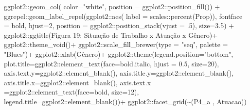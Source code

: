 \documentclass[
]{article}
\newenvironment{Shaded}{\begin{snugshade}}{\end{snugshade}}
\newcommand{\AttributeTok}[1]{\textcolor[rgb]{0.77,0.63,0.00}{#1}}
\newcommand{\DecValTok}[1]{\textcolor[rgb]{0.00,0.00,0.81}{#1}}
\newcommand{\FloatTok}[1]{\textcolor[rgb]{0.00,0.00,0.81}{#1}}
\newcommand{\FunctionTok}[1]{\textcolor[rgb]{0.00,0.00,0.00}{#1}}
\newcommand{\NormalTok}[1]{#1}
\newcommand{\SpecialCharTok}[1]{\textcolor[rgb]{0.00,0.00,0.00}{#1}}
\newcommand{\StringTok}[1]{\textcolor[rgb]{0.31,0.60,0.02}{#1}}
\begin{document}
\begin{Shaded}
\begin{Highlighting}[]
\NormalTok{  ggplot2}\SpecialCharTok{::}\FunctionTok{geom\_col}\NormalTok{( }\AttributeTok{color=}\StringTok{"white"}\NormalTok{,}
                     \AttributeTok{position =}\NormalTok{ ggplot2}\SpecialCharTok{::}\FunctionTok{position\_fill}\NormalTok{()) }\SpecialCharTok{+}
\NormalTok{  ggrepel}\SpecialCharTok{::}\FunctionTok{geom\_label\_repel}\NormalTok{(ggplot2}\SpecialCharTok{::}\FunctionTok{aes}\NormalTok{(}
    \AttributeTok{label =}\NormalTok{ scales}\SpecialCharTok{::}\FunctionTok{percent}\NormalTok{(Prop)),}
    \AttributeTok{fontface =} \StringTok{\textquotesingle{}bold\textquotesingle{}}\NormalTok{,}
    \AttributeTok{hjust=}\DecValTok{2}\NormalTok{,}
    \AttributeTok{position =}\NormalTok{ ggplot2}\SpecialCharTok{::}\FunctionTok{position\_stack}\NormalTok{(}\AttributeTok{vjust =}\NormalTok{ .}\DecValTok{5}\NormalTok{),}
    \AttributeTok{size=}\FloatTok{3.5}\NormalTok{) }\SpecialCharTok{+}
\NormalTok{  ggplot2}\SpecialCharTok{::}\FunctionTok{ggtitle}\NormalTok{(}\StringTok{\textquotesingle{}Figura 19: Situação de Trabalho x Atuação x Gênero\textquotesingle{}}\NormalTok{)}\SpecialCharTok{+}
\NormalTok{  ggplot2}\SpecialCharTok{::}\FunctionTok{theme\_void}\NormalTok{()}\SpecialCharTok{+}
\NormalTok{  ggplot2}\SpecialCharTok{::}\FunctionTok{scale\_fill\_brewer}\NormalTok{(}\AttributeTok{type =} \StringTok{"seq"}\NormalTok{, }\AttributeTok{palette =} \StringTok{"Blues"}\NormalTok{)}\SpecialCharTok{+}
\NormalTok{  ggplot2}\SpecialCharTok{::}\FunctionTok{xlab}\NormalTok{(}\StringTok{\textquotesingle{}Gênero\textquotesingle{}}\NormalTok{)}\SpecialCharTok{+}
\NormalTok{  ggplot2}\SpecialCharTok{::}\FunctionTok{theme}\NormalTok{(}\AttributeTok{legend.position=}\StringTok{"bottom"}\NormalTok{,}
                 \AttributeTok{plot.title=}\NormalTok{ggplot2}\SpecialCharTok{::}\FunctionTok{element\_text}\NormalTok{(}\AttributeTok{face=}\StringTok{\textquotesingle{}bold.italic\textquotesingle{}}\NormalTok{,}
                                                  \AttributeTok{hjust =} \FloatTok{0.5}\NormalTok{, }\AttributeTok{size=}\DecValTok{20}\NormalTok{),}
                 \AttributeTok{axis.text.y=}\NormalTok{ggplot2}\SpecialCharTok{::}\FunctionTok{element\_blank}\NormalTok{(),}
                 \AttributeTok{axis.title.y=}\NormalTok{ggplot2}\SpecialCharTok{::}\FunctionTok{element\_blank}\NormalTok{(),}
                 \AttributeTok{axis.title.x=}\NormalTok{ggplot2}\SpecialCharTok{::}\FunctionTok{element\_blank}\NormalTok{(),}
                 \AttributeTok{axis.text.x =}\NormalTok{ggplot2}\SpecialCharTok{::}\FunctionTok{element\_text}\NormalTok{(}\AttributeTok{face=}\StringTok{\textquotesingle{}bold\textquotesingle{}}\NormalTok{, }\AttributeTok{size=}\DecValTok{12}\NormalTok{),}
                 \AttributeTok{legend.title=}\NormalTok{ggplot2}\SpecialCharTok{::}\FunctionTok{element\_blank}\NormalTok{())}\SpecialCharTok{+}
\NormalTok{  ggplot2}\SpecialCharTok{::}\FunctionTok{facet\_grid}\NormalTok{(}\SpecialCharTok{\textasciitilde{}}\StringTok{\textasciigrave{}}\AttributeTok{(\textquotesingle{}P4\_a \textquotesingle{}, \textquotesingle{}Atuacao\textquotesingle{})}\StringTok{\textasciigrave{}}\NormalTok{)}
\end{Highlighting}
\end{Shaded}
\end{document}
